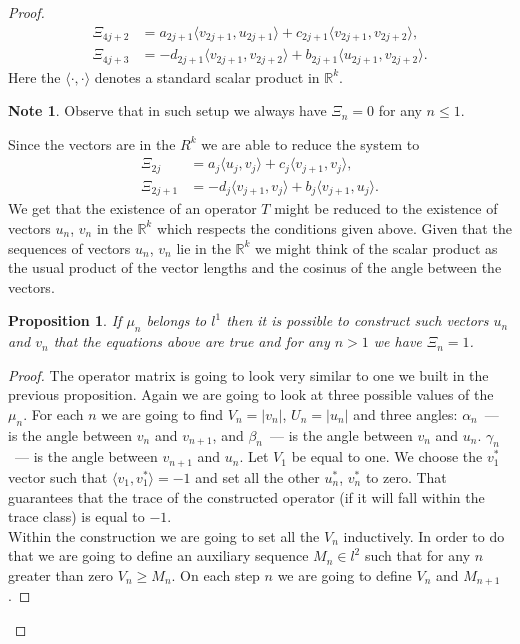 \documentclass[12pt]{article}
\renewcommand{\leq}{\leqslant}
\renewcommand{\geq}{\geqslant}
\newtheorem{prop}{Proposition}
\theoremstyle{definition}
\newtheorem*{note}{Note}
\numberwithin{remark}{section}
\numberwithin{theorem}{section}
\numberwithin{prop}{section}
\numberwithin{equation}{section}
\numberwithin{lemma}{section}
\numberwithin{prop_under_lemma}{lemma}
\begin{document}
\begin{proof}
\begin{align*}
            \Xi_{4j + 2} &= a_{2j+1} \langle v_{2j+1}, u_{2j+1} \rangle + c_{2j+1} \langle v_{2j+1}, v_{2j+2} \rangle,\\
            \Xi_{4j + 3} &= -d_{2j+1} \langle v_{2j+1}, v_{2j+2}\rangle + b_{2j+1} \langle u_{2j+1}, v_{2j+2} \rangle.
        \end{align*}
        Here the $\langle\cdot, \cdot\rangle$ denotes a standard scalar product in $\mathbb{R}^k$.
        \begin{note}
        Observe that in such setup we always have $\Xi_n = 0$ for any $n \leq 1$.
        \end{note}
        Since the vectors are in the $R^k$ we are able to reduce the system to
        \begin{align*}
            \Xi_{2j} &= a_{j} \langle u_{j}, v_{j} \rangle  + c_{j} \langle v_{j+1}, v_{j} \rangle,\\
            \Xi_{2j + 1} &= -d_{j} \langle v_{j+1}, v_{j} \rangle + b_{j} \langle v_{j+1}, u_{j}\rangle.
        \end{align*}
        We get that the existence of an operator $T$
        might be reduced to the existence of vectors $u_n$, $v_n$ in the $\mathbb{R}^k$ which
        respects the conditions given above.
        Given that the sequences of vectors $u_n$, $v_n$ lie in the $\mathbb{R}^k$ we might think of the scalar product as
        the usual product of the vector lengths and the cosinus of the angle between the vectors.
        \begin{prop}
            \label{k-dim-statement}
            If $\mu_n$ belongs to $l^1$ then it is possible to construct such vectors $u_n$ and $v_n$ that the equations above are true and for any $n > 1$ we have $\Xi_n = 1$.
        \end{prop}
        \begin{proof}
            The operator matrix is going to look very similar to one we built in the previous proposition.
            Again we are going to look at three possible values of the $\mu_n$.
            For each $n$ we are going to find $V_n = |v_n|$, $U_n = |u_n|$ and three angles:
            $\alpha_n$~--- is the angle between $v_n$ and $v_{n + 1}$, and
            $\beta_n$~--- is the angle between $v_n$ and $u_n$.
            $\gamma_n$~--- is the angle between $v_{n + 1}$ and $u_n$.
            Let $V_1$ be equal to one.
            We choose the $v^*_1$ vector such that $\langle v_1, v^*_1 \rangle = -1$ and set all
            the other $u^*_n$, $v^*_n$ to zero. That guarantees that the trace of the constructed operator (if it
            will fall within the trace class) is equal to $-1$.\\
            Within the construction we are going to set all the $V_n$ inductively. In order to do
            that we are going to define an auxiliary sequence $M_n \in l^2$ such that for any $n$ greater than zero
            $V_n \geq M_n$. On each step $n$ we are going to define $V_n$ and $M_{n+1}$.
            

\end{proof}
\end{proof}
\end{document}
